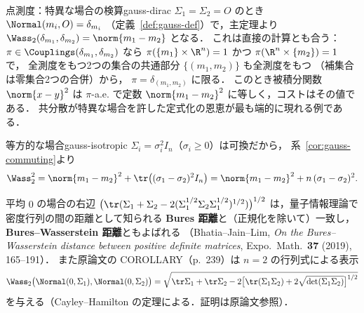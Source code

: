 \begin{example}{点測度：特異な場合の検算}{gauss-dirac}
  $\Sigma_1=\Sigma_2=O$ のとき $\Normal(m_i,O)=\delta_{m_i}$
  （定義~\ref{def:gauss-def}）で，主定理より
  $\Wass_2(\delta_{m_1},\delta_{m_2})=\norm{m_1-m_2}$ となる．
  これは直接の計算とも合う：
  $\pi\in\Couplings(\delta_{m_1},\delta_{m_2})$ なら
  $\pi(\{m_1\}\times\R^n)=1$ かつ $\pi(\R^n\times\{m_2\})=1$ で，
  全測度をもつ2つの集合の共通部分 $\{(m_1,m_2)\}$ も全測度をもつ
  （補集合は零集合2つの合併）から，
  $\pi=\delta_{(m_1,m_2)}$ に限る．
  このとき被積分関数 $\norm{x-y}^2$ は $\pi$-a.e. で定数
  $\norm{m_1-m_2}^2$ に等しく，コストはその値である．
  共分散が特異な場合を許した定式化の恩恵が最も端的に現れる例である．
\end{example}

\begin{example}{等方的な場合}{gauss-isotropic}
  $\Sigma_i=\sigma_i^2I_n$（$\sigma_i\geq0$）は可換だから，
  系~\ref{cor:gauss-commuting}より
  \[
    \Wass_2^2
    =\norm{m_1-m_2}^2+\tr\bigl((\sigma_1-\sigma_2)^2I_n\bigr)
    =\norm{m_1-m_2}^2+n\,(\sigma_1-\sigma_2)^2.
  \]
\end{example}

\begin{memo*}
  平均 $0$ の場合の右辺
  $\bigl(\tr(\Sigma_1+\Sigma_2-2(\Sigma_1^{1/2}\Sigma_2\Sigma_1^{1/2})^{1/2})\bigr)^{1/2}$
  は，量子情報理論で密度行列の間の距離として知られる
  \textbf{Bures 距離}と（正規化を除いて）一致し，
  \textbf{Bures--Wasserstein 距離}ともよばれる
  （Bhatia--Jain--Lim,
  \emph{On the Bures--Wasserstein distance between positive definite matrices},
  Expo.\ Math.\ \textbf{37} (2019), 165--191）．
  また原論文の COROLLARY（p.~239）は $n=2$ の行列式による表示
  \[
    \Wass_2\bigl(\Normal(0,\Sigma_1),\Normal(0,\Sigma_2)\bigr)
    =\sqrt{\tr\Sigma_1+\tr\Sigma_2
      -2\bigl[\tr(\Sigma_1\Sigma_2)+2\sqrt{\det(\Sigma_1\Sigma_2)}\bigr]^{1/2}}
  \]
  を与える（Cayley--Hamilton の定理による．証明は原論文参照）．
\end{memo*}

